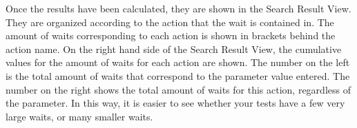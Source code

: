 Once the results have been calculated, they are shown in the Search Result View. They are organized according to the action that the wait is contained in. The amount of waits corresponding to each action is shown in brackets behind the action name. On the right hand side of the Search Result View, the cumulative values for the amount of waits for each action are shown. The number on the left is the total amount of waits that correspond to the parameter value entered. The number on the right shows the total amount of waits for this action, regardless of the parameter. In this way, it is easier to see whether your tests have a few very large waits, or many smaller waits. 


